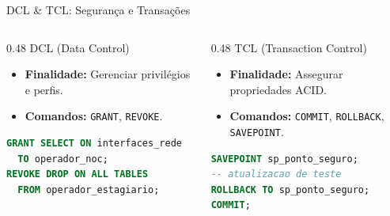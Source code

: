 \begin{frame}[fragile]{DCL \& TCL: Segurança e Transações}
  \vspace{-0.3cm}
  \begin{columns}[t]
    \begin{column}{0.48\textwidth}
      \alert{DCL (Data Control)}\par
      \vspace{0.05cm}
      \begin{itemize}\setlength{\itemsep}{2pt}
        \item \textbf{Finalidade:} Gerenciar privilégios e perfis.
        \item \textbf{Comandos:} \texttt{GRANT}, \texttt{REVOKE}.
      \end{itemize}
      \vspace{0.05cm}
\begin{lstlisting}[language=SQL,basicstyle=\ttfamily\tiny]
GRANT SELECT ON interfaces_rede 
  TO operador_noc;
REVOKE DROP ON ALL TABLES 
  FROM operador_estagiario;
\end{lstlisting}
    \end{column}

    \begin{column}{0.48\textwidth}
      \alert{TCL (Transaction Control)}\par
      \vspace{0.05cm}
      \begin{itemize}\setlength{\itemsep}{2pt}
        \item \textbf{Finalidade:} Assegurar propriedades ACID.
        \item \textbf{Comandos:} \texttt{COMMIT}, \texttt{ROLLBACK}, \texttt{SAVEPOINT}.
      \end{itemize}
      \vspace{0.05cm}
\begin{lstlisting}[language=SQL,basicstyle=\ttfamily\tiny]
SAVEPOINT sp_ponto_seguro;
-- atualizacao de teste
ROLLBACK TO sp_ponto_seguro;
COMMIT;
\end{lstlisting}
    \end{column}
  \end{columns}
\end{frame}
